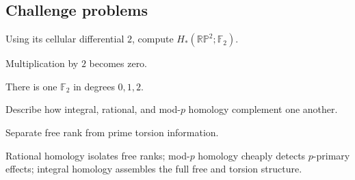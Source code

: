 \subsection*{Challenge problems}

\begin{exercise}[RP2 mod 2]\label{exr:viii25-ped-15}
Using its cellular differential $2$, compute $H_*(\mathbb{RP}^2;\mathbb F_2)$.
\end{exercise}
\begin{hint}
Multiplication by $2$ becomes zero.
\end{hint}
\begin{solution}
There is one $\mathbb F_2$ in degrees $0,1,2$.
\end{solution}

\begin{exercise}\label{exr:viii25-ped-16}
Describe how integral, rational, and mod-$p$ homology complement one another.
\end{exercise}
\begin{hint}
Separate free rank from prime torsion information.
\end{hint}
\begin{solution}
Rational homology isolates free ranks; mod-$p$ homology cheaply detects $p$-primary effects; integral homology assembles the full free and torsion structure.
\end{solution}


